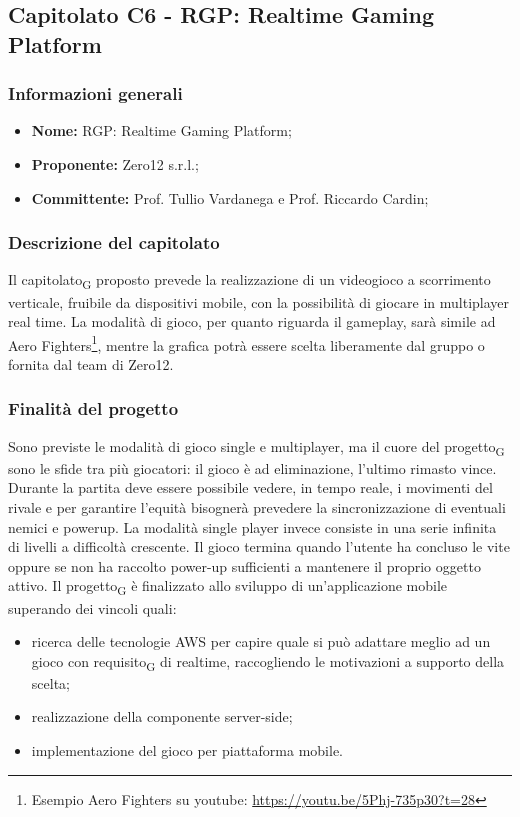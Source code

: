 \subsection{Capitolato C6 - RGP: Realtime Gaming Platform}
\subsubsection{Informazioni generali}
	\begin{itemize}
	\item \textbf{Nome:} RGP: Realtime Gaming Platform;
	\item \textbf{Proponente:} Zero12 s.r.l.;
	\item \textbf{Committente:}  Prof. Tullio Vardanega e Prof. Riccardo Cardin;
	\end{itemize}
\subsubsection{Descrizione del capitolato}
    Il capitolato\textsubscript{G} proposto prevede la realizzazione di un videogioco a scorrimento verticale, fruibile da dispositivi mobile, con la possibilità di giocare in multiplayer real time.
    La modalità di gioco, per quanto riguarda il gameplay, sarà simile ad Aero Fighters\footnote{Esempio Aero Fighters su youtube: \url{https://youtu.be/5Phj-735p30?t=28}}, mentre la grafica potrà essere scelta liberamente dal gruppo o fornita dal team di Zero12.

\subsubsection{Finalità del progetto}
    Sono previste le modalità di gioco single e multiplayer, ma
    il cuore del progetto\textsubscript{G} sono le sfide tra più giocatori: il gioco è ad eliminazione, l'ultimo rimasto vince.
    Durante la partita deve essere possibile vedere, in tempo reale, i movimenti del rivale e per garantire l'equità bisognerà prevedere la sincronizzazione di eventuali nemici e powerup.
    La modalità single player invece consiste in una serie infinita di livelli a difficoltà crescente. Il gioco termina quando l'utente ha concluso le vite oppure se non ha raccolto power-up sufficienti a mantenere il proprio oggetto attivo.
    Il progetto\textsubscript{G} è finalizzato allo sviluppo di un'applicazione mobile superando dei vincoli quali:
    \begin{itemize}
    	\item ricerca delle tecnologie AWS per capire quale si può adattare meglio ad un gioco con requisito\textsubscript{G} di realtime, raccogliendo le motivazioni a supporto della scelta;
    	\item realizzazione della componente server-side;
    	\item implementazione del gioco per piattaforma mobile.
    \end{itemize}
